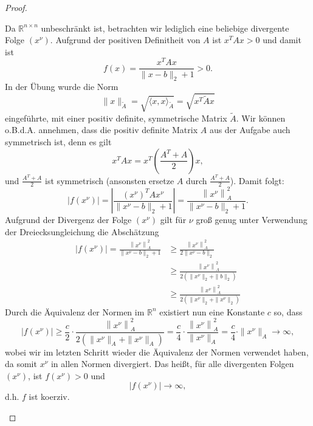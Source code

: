 \documentclass[12pt]{extreport} %
\newcommand{\R}{\mathbb{R}}
\theoremstyle{named}
\theoremstyle{nnamed}
\theoremstyle{itshape}
\theoremstyle{normal}
\begin{document}
\begin{proof}
\begin{enumerate}
			Da $\R^{n \times n}$ unbeschränkt ist, betrachten wir lediglich eine beliebige divergente Folge $(x^\nu)$. Aufgrund der positiven Definitheit von $A$ ist $ x^T A x > 0$ und damit ist
			$$ f(x) = \frac{x^T A x}{\| x - b\|_2 + 1} > 0.$$ 
			In der Übung wurde die Norm
			$$ \| x \|_{\tilde{A}} = \sqrt{\langle x, x \rangle_{\tilde{A}}} = \sqrt{x^T \tilde{A} x} $$
			eingeführte, mit einer positiv definite, symmetrische Matrix $\tilde{A}$. Wir können o.B.d.A. annehmen, dass die positiv definite Matrix $A$ aus der Aufgabe auch symmetrisch ist, denn es gilt
			$$ x^T A x = x^T \left( \frac{A^T + A}{2} \right) x, $$
			und $\frac{A^T + A}{2}$ ist symmetrisch (ansonsten ersetze $A$ durch $\frac{A^T + A}{2}$). Damit folgt:
			$$ \left| f(x^\nu) \right| =  \left| \frac{\left(x^\nu \right)^T A x^\nu }{\| x^\nu - b\|_2 + 1} \right| = \frac{\left\| x^\nu \right\|_{A}^2}{\| x^\nu - b\|_2 + 1}. $$
			Aufgrund der Divergenz der Folge $(x^\nu)$ gilt für $\nu$ groß genug unter Verwendung der Dreiecksungleichung die Abschätzung
			\begin{align*}
				 \left| f(x^\nu) \right| =  \frac{\left\| x^\nu \right\|_{A}^2}{\| x^\nu - b\|_2 + 1} & \geq \frac{\left\| x^\nu \right\|_{A}^2}{2 \| x^\nu - b\|_2 } \\
				 	& \geq \frac{\left\| x^\nu \right\|_{A}^2}{2 \left( \| x^\nu \|_2 + \| b\|_2 \right)}   \\
				 	& \geq \frac{\left\| x^\nu \right\|_{A}^2}{2 \left( \| x^\nu \|_2 + \| x^\nu \|_2 \right)}  
			\end{align*}
			Durch die Äquivalenz der Normen im $\R^n$ existiert nun eine Konstante $c$ so, dass
			$$ 		\left| f(x^\nu) \right|  \geq \frac{c}{2} \cdot \frac{\left\| x^\nu \right\|_{A}^2}{2 \left( \| x^\nu \|_A + \| x^\nu \|_A \right)} = \frac{c}{4} \cdot \frac{\left\| x^\nu \right\|_{A}^2}{ \| x^\nu \|_A} = \frac{c}{4} \cdot \| x^\nu \|_A \rightarrow \infty, $$
			wobei wir im letzten Schritt wieder die Äquivalenz der Normen verwendet haben, da somit $x^\nu$ in allen Normen divergiert. Das heißt, für alle divergenten Folgen $(x^\nu)$, ist $f(x^\nu) > 0$ und
			$$ \left| f(x^\nu) \right| \rightarrow \infty, $$
			d.h. $f$ ist koerziv.
	\end{enumerate}
\end{proof}

\newpage
\end{document}
